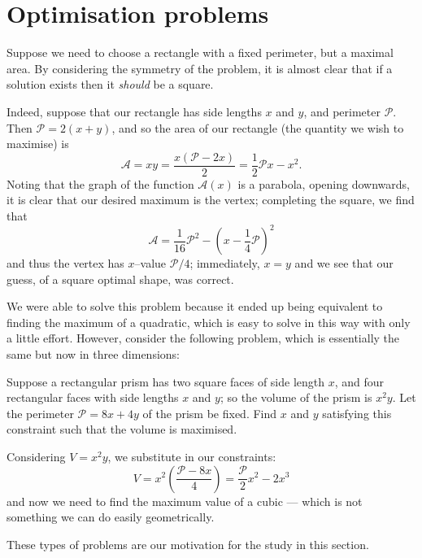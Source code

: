 \section{Optimisation problems}
Suppose we need to choose a rectangle with a fixed perimeter, but a maximal area. By considering the
symmetry of the problem, it is almost clear that if a solution exists then it \emph{should} be a square.

Indeed, suppose that our rectangle has side lengths $ x $ and $ y $, and perimeter $ \mathcal{P} $. Then $ \mathcal{P} = 2(x + y) $,
and so the area of our rectangle (the quantity we wish to maximise) is
\begin{displaymath}
  \mathcal{A} = xy = \frac{x(\mathcal{P} - 2x)}{2} = \frac{1}{2}\mathcal{P}x - x^2.
\end{displaymath}
Noting that the graph of the function $ \mathcal{A}(x) $ is a parabola, opening downwards, it is clear
that our desired maximum is the vertex; completing the square, we find that
\begin{displaymath}
  \mathcal{A} = \frac{1}{16}\mathcal{P}^2 - \left(x - \frac{1}{4}\mathcal{P}\right)^2
\end{displaymath}
and thus the vertex has $ x$--value $ \mathcal{P}/4 $; immediately, $ x = y $ and we see that our guess,
of a square optimal shape, was correct.

We were able to solve this problem because it ended up being equivalent to finding the maximum of a quadratic,
which is easy to solve in this way with only a little effort. However, consider the following problem, which is
essentially the same but now in three dimensions:
\begin{pro}
  Suppose a rectangular prism has two square faces of side length $ x $, and four rectangular faces with side lengths $ x $
  and $ y $; so the volume of the prism is $ x^2 y $. Let the perimeter $ \mathcal{P} = 8x + 4y $ of the prism be fixed.
  Find $ x $ and $ y $ satisfying this constraint such that the volume is maximised.
\end{pro}
Considering $ V = x^2y $, we substitute in our constraints:
\begin{displaymath}
  V = x^2 \left( \frac{\mathcal{P} - 8x}{4} \right) = \frac{\mathcal{P}}{2} x^2 - 2x^3
\end{displaymath}
and now we need to find the maximum value of a cubic --- which is not something we can do easily geometrically.

These types of problems are our motivation for the study in this section.


